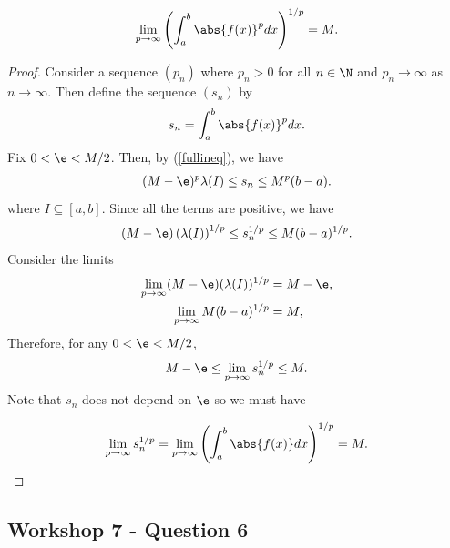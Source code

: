 \documentclass{article}
\begin{document}
\begin{claim*}
   \begin{align*}
      \lim_{p\to\infty} \left(\int_a^b \abs{f(x)}^p dx\right)^{1/p} = M.
   \end{align*}
\end{claim*}
\begin{proof}
   Consider a sequence $(p_n)$ where $p_n>0$ for all $n\in\N$ and
   $p_n\to\infty$ as $n\to\infty$. Then define the sequence $(s_n)$ by
   \begin{align*}
      s_n = \int_a^b \abs{f(x)}^pdx.
   \end{align*}
   Fix $0<\e<M/2$. Then, by (\ref{fullineq}), we have
   \begin{align*}
      (M-\e)^p\lambda(I) \leq s_n \leq M^p(b-a).
   \end{align*}
   where $I\subseteq [a,b]$. Since all the terms are positive, we have
   \begin{align*}
      (M-\e)\left(\lambda(I)\right)^{1/p} \leq
      s_n^{1/p} \leq
      M(b-a)^{1/p}.
   \end{align*}
   Consider the limits
   \begin{align*}
      \lim_{p\to\infty} (M-\e)(\lambda(I))^{1/p} & = M-\e, \\
      \lim_{p\to\infty} M(b-a)^{1/p}             & = M,    \\
   \end{align*}
   Therefore, for any $0<\e<M/2$,
   \begin{align*}
      M-\e \leq \lim_{p\to\infty} s_n^{1/p} \leq M.
   \end{align*}
   Note that $s_n$ does not depend on $\e$ so we must have

   \begin{align*}
      \lim_{p\to\infty} s_n^{1/p} = \lim_{p\to\infty} \left(\int_a^b \abs{f(x)}dx\right)^{1/p} = M.
   \end{align*}
\end{proof}

\subsection*{Workshop 7 - Question 6}
\end{document}
